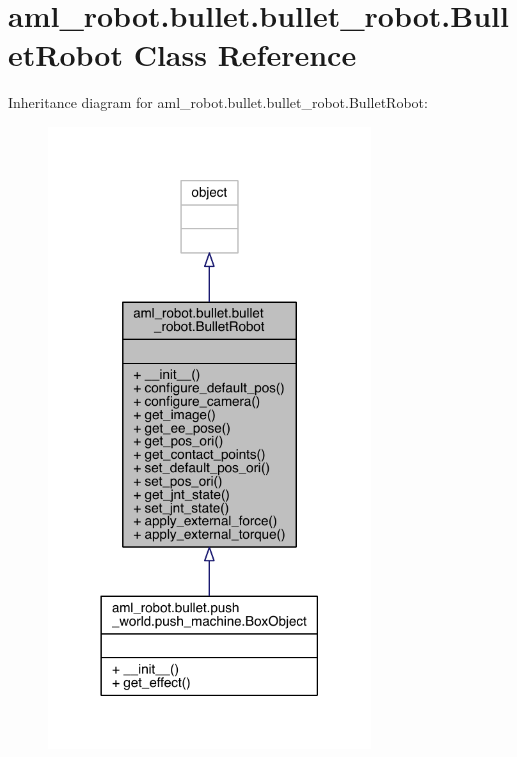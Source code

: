 \hypertarget{classaml__robot_1_1bullet_1_1bullet__robot_1_1_bullet_robot}{}\section{aml\+\_\+robot.\+bullet.\+bullet\+\_\+robot.\+Bullet\+Robot Class Reference}
\label{classaml__robot_1_1bullet_1_1bullet__robot_1_1_bullet_robot}


Inheritance diagram for aml\+\_\+robot.\+bullet.\+bullet\+\_\+robot.\+Bullet\+Robot\+:\nopagebreak
\begin{figure}[H]
\begin{center}
\leavevmode
\includegraphics[width=242pt]{classaml__robot_1_1bullet_1_1bullet__robot_1_1_bullet_robot__inherit__graph}
\end{center}
\end{figure}


